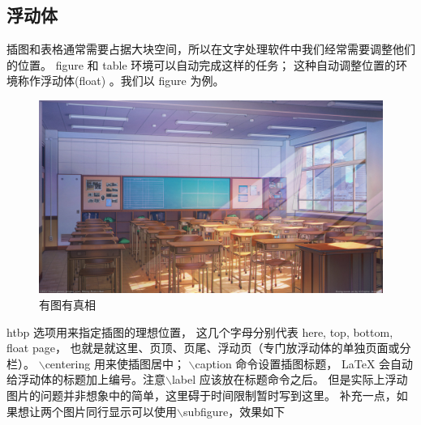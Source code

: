 \documentclass[12pt, a4paper, oneside, UTF8]{ctexart}
\begin{document}
\subsection{浮动体}
插图和表格通常需要占据大块空间，所以在文字处理软件中我们经常需要调整他们的位置。
figure 和 table 环境可以自动完成这样的任务；
这种自动调整位置的环境称作浮动体(float) 。我们以 figure 为例。
\begin{figure}[htbp]
    \centering
    \includegraphics[width = .8\textwidth]{classroom.png}
    \caption{有图有真相}
    \label{fig:myphoto}
\end{figure}
htbp 选项用来指定插图的理想位置，
这几个字母分别代表 here, top, bottom, float page，
也就是就这里、页顶、页尾、浮动页（专门放浮动体的单独页面或分栏）。
$\backslash$centering 用来使插图居中；
$\backslash$caption 命令设置插图标题，
LaTeX 会自动给浮动体的标题加上编号。注意$\backslash$label 应该放在标题命令之后。
但是实际上浮动图片的问题并非想象中的简单，这里碍于时间限制暂时写到这里。
补充一点，如果想让两个图片同行显示可以使用$\backslash$subfigure，效果如下
\end{document}
